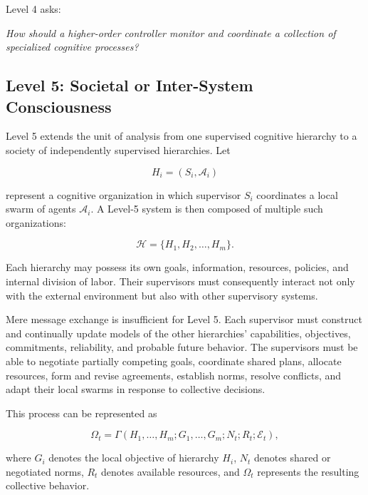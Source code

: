 Level 4 asks:

\textit{How should a higher-order controller monitor and coordinate a collection of specialized cognitive processes?}

\subsection{Level 5: Societal or Inter-System Consciousness}

Level 5 extends the unit of analysis from one supervised cognitive hierarchy to a society of independently supervised hierarchies. Let

\begin{equation}\label{eq13}
H_i=(S_i,\mathcal{A}_i)
\end{equation}

represent a cognitive organization in which supervisor \(S_i\) coordinates a local swarm of agents \(\mathcal{A}_i\). A Level-5 system is then composed of multiple such organizations:

\begin{equation}\label{eq14}
\mathcal{H}
=
\{H_1,H_2,\ldots,H_m\}.
\end{equation}

Each hierarchy may possess its own goals, information, resources, policies, and internal division of labor. Their supervisors must consequently interact not only with the external environment but also with other supervisory systems.

Mere message exchange is insufficient for Level 5. Each supervisor must construct and continually update models of the other hierarchies’ capabilities, objectives, commitments, reliability, and probable future behavior. The supervisors must be able to negotiate partially competing goals, coordinate shared plans, allocate resources, form and revise agreements, establish norms, resolve conflicts, and adapt their local swarms in response to collective decisions.

This process can be represented as

\begin{equation}\label{eq15}
\Omega_t
=
\Gamma
\left(
H_1,\ldots,H_m;
G_1,\ldots,G_m;
N_t;
R_t;
\mathcal{E}_t
\right),
\end{equation}

where \(G_i\) denotes the local objective of hierarchy \(H_i\), \(N_t\) denotes shared or negotiated norms, \(R_t\) denotes available resources, and \(\Omega_t\) represents the resulting collective behavior.

